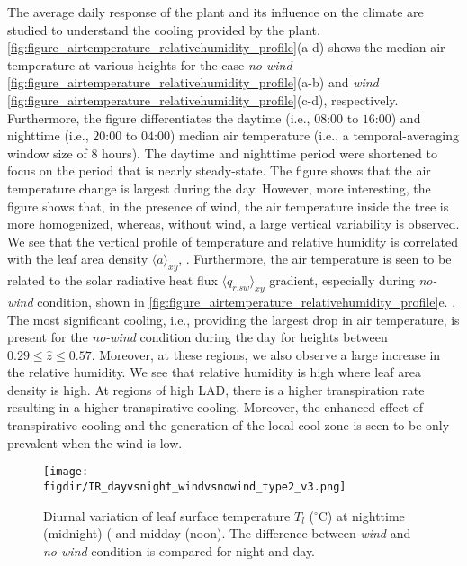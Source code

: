 The average daily response of the plant and its influence on the climate are studied to understand the cooling provided by the plant. \cref{fig:figure_airtemperature_relativehumidity_profile}(a-d) shows the median air temperature at various heights for the case \textit{no-wind} \cref{fig:figure_airtemperature_relativehumidity_profile}(a-b) and \textit{wind} \cref{fig:figure_airtemperature_relativehumidity_profile}(c-d), respectively. Furthermore, the figure differentiates the daytime (i.e., $08$:$00$ to $16$:$00$) and nighttime (i.e., $20$:$00$ to $04$:$00$) median air temperature (i.e., a temporal-averaging window size of 8 hours). The daytime and nighttime period were shortened to focus on the period that is nearly steady-state. The figure shows that the air temperature change is largest during the day. However, more interesting, the figure shows that, in the presence of wind, the air temperature inside the tree is more homogenized, whereas, without wind, a large vertical variability is observed. We see that the vertical profile of temperature and relative humidity is correlated with the leaf area density $\langle a \rangle_{\textit{xy}}$, . Furthermore, the air temperature is seen to be related to the solar radiative heat flux $\langle q_{\textit{r,sw}} \rangle_{\textit{xy}}$ gradient, especially during \textit{no-wind} condition, shown in \cref{fig:figure_airtemperature_relativehumidity_profile}e. . The most significant cooling, i.e., providing the largest drop in air temperature, is present for the \textit{no-wind} condition during the day for heights between $0.29\le \hat{z} \le0.57$. Moreover, at these regions, we also observe a large increase in the relative humidity. We see that relative humidity is high where leaf area density is high. At regions of high LAD, there is a higher transpiration rate resulting in a higher transpirative cooling. Moreover, the enhanced effect of transpirative cooling and the generation of the local cool zone is seen to be only prevalent when the wind is low. 

\begin{sidewaysfigure}[p]
	\centering 
	\texttt{[image: \\figdir/IR\_dayvsnight\_windvsnowind\_type2\_v3.png]}
	\caption{Diurnal variation of leaf surface temperature $T_l$ ($^{\circ}$C) at  nighttime (midnight) (  and midday (noon). The difference between \textit{wind} and \textit{no wind} condition is compared for  night and  day.}
	\label{fig:IR_dayvsnight_windvsnowind_type2_v2}
	
\end{sidewaysfigure}

